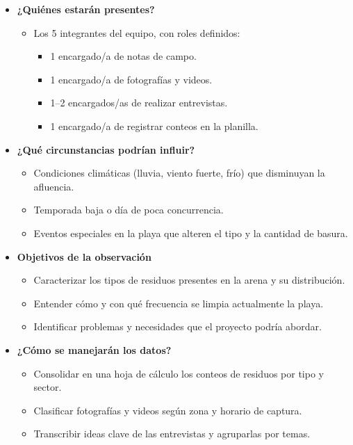 \documentclass[12pt]{article}
\begin{document}
\begin{itemize}
    \item \textbf{¿Quiénes estarán presentes?}
    \begin{itemize}
        \item Los 5 integrantes del equipo, con roles definidos:
        \begin{itemize}
            \item 1 encargado/a de notas de campo.
            \item 1 encargado/a de fotografías y videos.
            \item 1–2 encargados/as de realizar entrevistas.
            \item 1 encargado/a de registrar conteos en la planilla.
        \end{itemize}
    \end{itemize}

    \item \textbf{¿Qué circunstancias podrían influir?}
    \begin{itemize}
        \item Condiciones climáticas (lluvia, viento fuerte, frío) que disminuyan la afluencia.
        \item Temporada baja o día de poca concurrencia.
        \item Eventos especiales en la playa que alteren el tipo y la cantidad de basura.
    \end{itemize}

    \item \textbf{Objetivos de la observación}
    \begin{itemize}
        \item Caracterizar los tipos de residuos presentes en la arena y su distribución.
        \item Entender cómo y con qué frecuencia se limpia actualmente la playa.
        \item Identificar problemas y necesidades que el proyecto podría abordar.
    \end{itemize}

    \item \textbf{¿Cómo se manejarán los datos?}
    \begin{itemize}
        \item Consolidar en una hoja de cálculo los conteos de residuos por tipo y sector.
        \item Clasificar fotografías y videos según zona y horario de captura.
        \item Transcribir ideas clave de las entrevistas y agruparlas por temas.
    \end{itemize}


\end{itemize}
\end{document}
